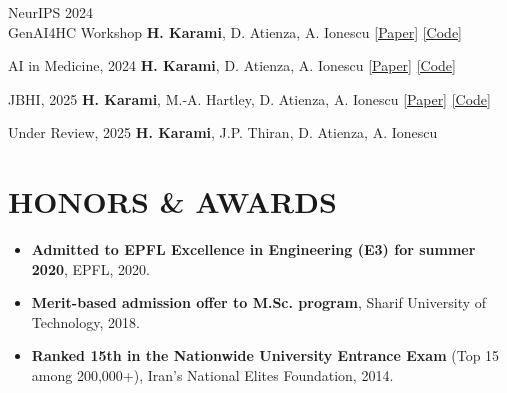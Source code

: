 \documentclass[10pt, letterpaper]{article}
\let\hrefWithoutArrow\href %
\renewcommand{\href}[2]{\hrefWithoutArrow{#1}{\ifthenelse{\equal{#2}{}}{ }{#2 }\raisebox{.15ex}{\footnotesize \faExternalLink*}}}
\begin{document}
\begin{itemize}[leftmargin=*, label={}, itemsep=2pt]

    {NeurIPS 2024 \\ GenAI4HC Workshop}
    {\textbf{H. Karami}, D. Atienza, A. Ionescu}
    {\hrefWithoutArrow{https://arxiv.org/abs/2411.13428}{[Paper]} \hrefWithoutArrow{https://github.com/hojjatkarami/SynEHRgy}{[Code]}}

    {AI in Medicine, 2024}
    {\textbf{H. Karami}, D. Atienza, A. Ionescu}
    {\hrefWithoutArrow{https://www.sciencedirect.com/science/article/pii/S0933365724001453}{[Paper]} \hrefWithoutArrow{https://github.com/esl-epfl/TEE4EHR}{[Code]}}

    {JBHI, 2025}
    {\textbf{H. Karami}, M.-A. Hartley, D. Atienza, A. Ionescu}
    {\hrefWithoutArrow{https://ieeexplore.ieee.org/abstract/document/11027528/}{[Paper]} \hrefWithoutArrow{https://github.com/esl-epfl/TimEHR}{[Code]}}

    {Under Review, 2025}
    {\textbf{H. Karami}, J.P. Thiran, D. Atienza, A. Ionescu}

\end{itemize}

\section{HONORS \& AWARDS}

\begin{itemize}
    \itemsep -3pt {}
    \item \textbf{Admitted to EPFL Excellence in Engineering (E3) for summer 2020}, EPFL, 2020.
    \item \textbf{Merit-based admission offer to M.Sc. program}, Sharif University of Technology, 2018.
    \item \textbf{Ranked 15th in the Nationwide University Entrance Exam} (Top 15 among 200,000+), Iran's National Elites Foundation, 2014.
\end{itemize}
\end{document}
